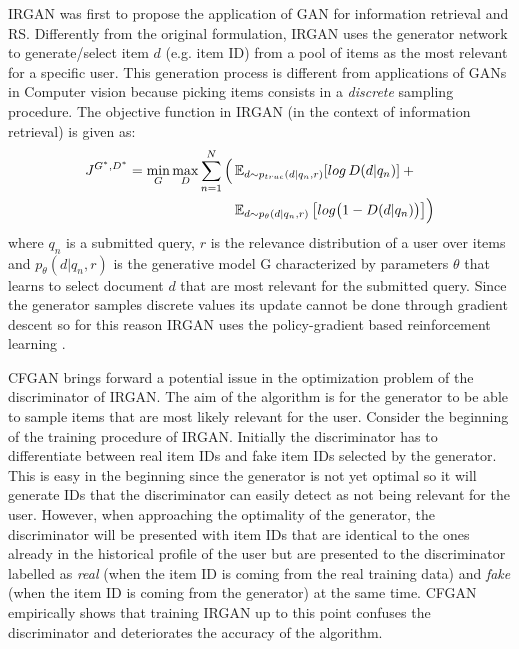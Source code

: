 IRGAN \cite{wang2017irgan} was first to propose the application of GAN for information retrieval and RS. Differently from the original formulation, IRGAN uses the generator network to generate/select item $d$ (e.g. item ID) from a pool of items as the most relevant for a specific user. This generation process is different from applications of GANs in Computer vision because picking items consists in a \emph{discrete} sampling procedure. The objective function in IRGAN (in the context of information retrieval) is given as:
\[
    \begin{split}
        J^{G^*,D^*} = \min_{G} \max_{D} \sum_{n=1}^N\Big(
        & \operatorname{\mathbb{E}}_{d \sim{p_{true}(d|q_{n},r)}}[log \, D(d|q_{n})] \: + \: \\
        & \operatorname{\mathbb{E}}_{d \sim p_{\theta}(d|q_{n},r)}\big[log\big(1-D(d|q_{n})\big)\big]\Big)
    \end{split}
\]
where $q_{n}$ is a submitted query, $r$ is the relevance distribution of a user over items and $p_{\theta}(d|q_{n},r)$ is the generative model G characterized by parameters $\theta$ that learns to select document $d$ that are most relevant for the submitted query. Since the generator samples discrete values its update cannot be done through gradient descent so for this reason IRGAN uses the policy-gradient based reinforcement learning \cite{williams1992simple}.

CFGAN \cite{chae2018cfgan} brings forward a potential issue in the optimization problem of the discriminator of IRGAN. The aim of the algorithm is for the generator to be able to sample items that are most likely relevant for the user. Consider the beginning of the training procedure of IRGAN. Initially the discriminator has to differentiate between real item IDs and fake item IDs selected by the generator. This is easy in the beginning since the generator is not yet optimal so it will generate IDs that the discriminator can easily detect as not being relevant for the user. However, when approaching the optimality of the generator, the discriminator will be presented with item IDs that are identical to the ones already in the historical profile of the user but are presented to the discriminator labelled as \emph{real} (when the item ID is coming from the real training data) and \emph{fake} (when the item ID is coming from the generator) at the same time. CFGAN empirically shows that training IRGAN up to this point confuses the discriminator and deteriorates the accuracy of the algorithm.

